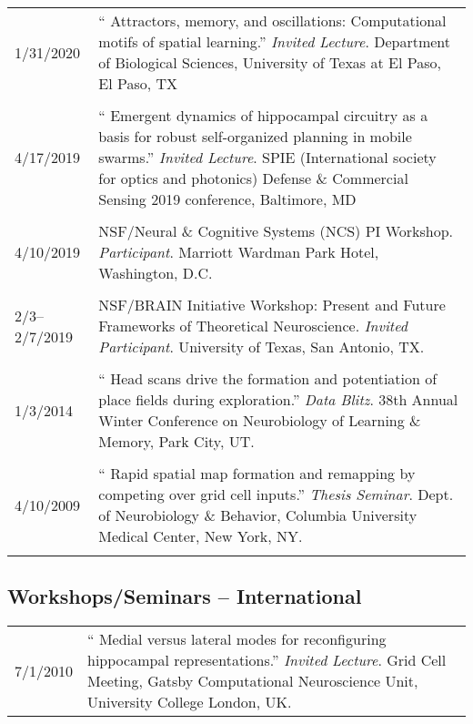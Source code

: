 \documentclass[10pt]{article}
\newcommand{\unpubtitle}[1]{{\color{hopkinsblue} #1}}
\begin{document}
\begin{longtable}{@{\hspace{0.2in}}l>{\raggedright\arraybackslash}p{}}
  1/31/2020 \hspace{0.3in} & ``\unpubtitle{Attractors, memory, and oscillations:
  Computational motifs of spatial learning}.'' \emph{Invited Lecture}.
  Department of Biological Sciences, University of Texas at El Paso, El Paso, TX\\
  \tabularnewline
  4/17/2019 \hspace{0.3in} & ``\unpubtitle{Emergent dynamics of hippocampal
  circuitry as a basis for robust self-organized planning in mobile swarms}.''
  \emph{Invited Lecture}. SPIE (International society for optics and photonics)
  Defense \& Commercial Sensing 2019 conference, Baltimore, MD\\
  \tabularnewline
  4/10/2019 & NSF/Neural \& Cognitive Systems (NCS) PI
  Workshop. \emph{Participant}. Marriott Wardman Park Hotel, Washington, D.C.\\
  \tabularnewline
  2/3--2/7/2019 & NSF/BRAIN Initiative Workshop: Present and Future Frameworks
  of Theoretical Neuroscience. \emph{Invited Participant}. University of Texas,
  San Antonio, TX.\\
  \tabularnewline
  1/3/2014 & ``\unpubtitle{Head scans drive the formation and potentiation
  of place fields during exploration}.'' \emph{Data Blitz}. 38th Annual Winter
  Conference on Neurobiology of Learning \& Memory, Park City, UT.\\
  \tabularnewline
  4/10/2009 & ``\unpubtitle{Rapid spatial map formation and remapping by
  competing over grid cell inputs}.'' \emph{Thesis Seminar}. Dept. of Neurobiology
  \& Behavior, Columbia University Medical Center, New York, NY.\\
  \tabularnewline
\end{longtable}

\subsection*{Workshops/Seminars -- International}

\begin{tabular}{@{\hspace{0.2in}}l>{\raggedright\arraybackslash}p{}}
  7/1/2010 \hspace{0.2in} & ``\unpubtitle{Medial versus lateral modes for
  reconfiguring hippocampal representations}.'' \emph{Invited Lecture}. Grid
  Cell Meeting, Gatsby Computational Neuroscience Unit, University College
  London, UK.\\
\end{tabular}
\end{document}
